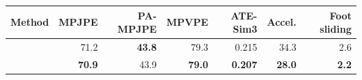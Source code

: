 \begin{tabular}{lrrrrrr}
\toprule
Method & MPJPE & PA-MPJPE & MPVPE & ATE-Sim3 & Accel. & Foot sliding \\
\midrule
\humanthree{} & 71.2 & \textbf{43.8} & 79.3 & 0.215 & 34.3 & 2.6 \\
\method{} & \textbf{70.9} & 43.9 & \textbf{79.0} & \textbf{0.207} & \textbf{28.0} & \textbf{2.2} \\
\bottomrule
\end{tabular}
